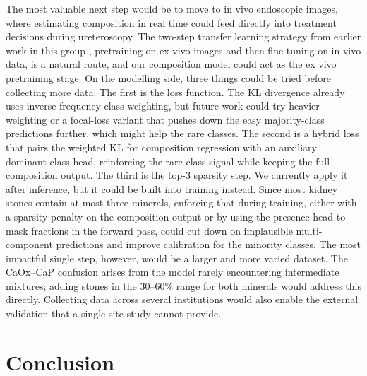 \documentclass[10pt,twocolumn]{article}
\begin{document}
The most valuable next step would be to move to in vivo endoscopic images, where estimating composition in real time could feed directly into treatment decisions during ureteroscopy. The two-step transfer learning strategy from earlier work in this group \cite{veltheer2025}, pretraining on ex vivo images and then fine-tuning on in vivo data, is a natural route, and our composition model could act as the ex vivo pretraining stage.
On the modelling side, three things could be tried before collecting more data. The first is the loss function. The KL divergence already uses inverse-frequency class weighting, but future work could try heavier weighting or a focal-loss variant that pushes down the easy majority-class predictions further, which might help the rare classes. The second is a hybrid loss that pairs the weighted KL for composition regression with an auxiliary dominant-class head, reinforcing the rare-class signal while keeping the full composition output. The third is the top-3 sparsity step. We currently apply it after inference, but it could be built into training instead. Since most kidney stones contain at most three minerals, enforcing that during training, either with a sparsity penalty on the composition output or by using the presence head to mask fractions in the forward pass, could cut down on implausible multi-component predictions and improve calibration for the minority classes.
The most impactful single step, however, would be a larger and more varied dataset. The CaOx--CaP confusion arises from the model rarely encountering intermediate mixtures; adding stones in the 30--60\% range for both minerals would address this directly. Collecting data across several institutions would also enable the external validation that a single-site study cannot provide.

\section*{Conclusion}
 
\end{document}

